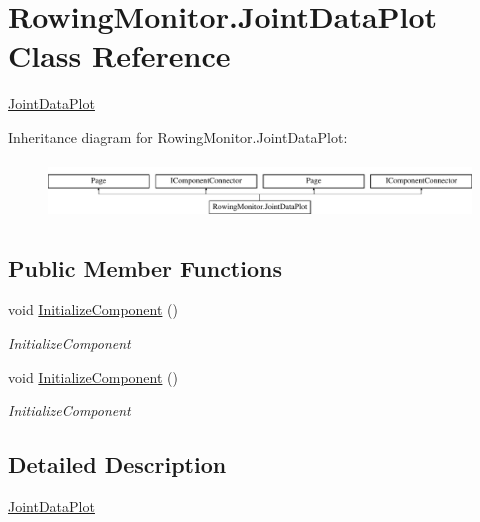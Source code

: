 \hypertarget{class_rowing_monitor_1_1_joint_data_plot}{}\section{Rowing\+Monitor.\+Joint\+Data\+Plot Class Reference}
\label{class_rowing_monitor_1_1_joint_data_plot}


\hyperlink{class_rowing_monitor_1_1_joint_data_plot}{Joint\+Data\+Plot}  


Inheritance diagram for Rowing\+Monitor.\+Joint\+Data\+Plot\+:\begin{figure}[H]
\begin{center}
\leavevmode
\includegraphics[height=1.538461cm]{class_rowing_monitor_1_1_joint_data_plot}
\end{center}
\end{figure}
\subsection*{Public Member Functions}
\begin{DoxyCompactItemize}
\item 
void \hyperlink{class_rowing_monitor_1_1_joint_data_plot_a8cfc1167162972427c71ab8247c1d19d}{Initialize\+Component} ()
\begin{DoxyCompactList}\small\item\em Initialize\+Component \end{DoxyCompactList}\item 
void \hyperlink{class_rowing_monitor_1_1_joint_data_plot_a8cfc1167162972427c71ab8247c1d19d}{Initialize\+Component} ()
\begin{DoxyCompactList}\small\item\em Initialize\+Component \end{DoxyCompactList}\end{DoxyCompactItemize}


\subsection{Detailed Description}
\hyperlink{class_rowing_monitor_1_1_joint_data_plot}{Joint\+Data\+Plot} 



